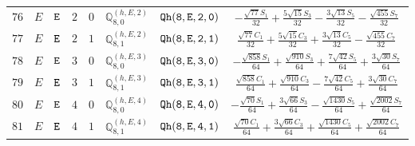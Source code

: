 \documentclass[fleqn,8pt]{jsarticle}
\begin{document}
\begin{table}[ht!]
\begin{center}
\begin{tabular}{cccccccc}
$ 76 $ & $ E $ & $ {\tt E} $ & $ 2 $ & $ 0 $ & $ \mathbb{Q}_{8,0}^{(h,E,2)} $ & $ {\tt Qh(8,E,2,0)} $ & $ - \frac{\sqrt{77} S_{1}}{32} + \frac{5 \sqrt{15} S_{3}}{32} - \frac{3 \sqrt{13} S_{5}}{32} - \frac{\sqrt{455} S_{7}}{32} $ \\
$ 77 $ & $ E $ & $ {\tt E} $ & $ 2 $ & $ 1 $ & $ \mathbb{Q}_{8,1}^{(h,E,2)} $ & $ {\tt Qh(8,E,2,1)} $ & $ \frac{\sqrt{77} C_{1}}{32} + \frac{5 \sqrt{15} C_{3}}{32} + \frac{3 \sqrt{13} C_{5}}{32} - \frac{\sqrt{455} C_{7}}{32} $ \\
$ 78 $ & $ E $ & $ {\tt E} $ & $ 3 $ & $ 0 $ & $ \mathbb{Q}_{8,0}^{(h,E,3)} $ & $ {\tt Qh(8,E,3,0)} $ & $ - \frac{\sqrt{858} S_{1}}{64} + \frac{\sqrt{910} S_{3}}{64} + \frac{7 \sqrt{42} S_{5}}{64} + \frac{3 \sqrt{30} S_{7}}{64} $ \\
$ 79 $ & $ E $ & $ {\tt E} $ & $ 3 $ & $ 1 $ & $ \mathbb{Q}_{8,1}^{(h,E,3)} $ & $ {\tt Qh(8,E,3,1)} $ & $ \frac{\sqrt{858} C_{1}}{64} + \frac{\sqrt{910} C_{3}}{64} - \frac{7 \sqrt{42} C_{5}}{64} + \frac{3 \sqrt{30} C_{7}}{64} $ \\
$ 80 $ & $ E $ & $ {\tt E} $ & $ 4 $ & $ 0 $ & $ \mathbb{Q}_{8,0}^{(h,E,4)} $ & $ {\tt Qh(8,E,4,0)} $ & $ - \frac{\sqrt{70} S_{1}}{64} + \frac{3 \sqrt{66} S_{3}}{64} - \frac{\sqrt{1430} S_{5}}{64} + \frac{\sqrt{2002} S_{7}}{64} $ \\
$ 81 $ & $ E $ & $ {\tt E} $ & $ 4 $ & $ 1 $ & $ \mathbb{Q}_{8,1}^{(h,E,4)} $ & $ {\tt Qh(8,E,4,1)} $ & $ \frac{\sqrt{70} C_{1}}{64} + \frac{3 \sqrt{66} C_{3}}{64} + \frac{\sqrt{1430} C_{5}}{64} + \frac{\sqrt{2002} C_{7}}{64} $ \\
 \hline \hline
\end{tabular}
\end{center}
\end{table}
\end{document}
